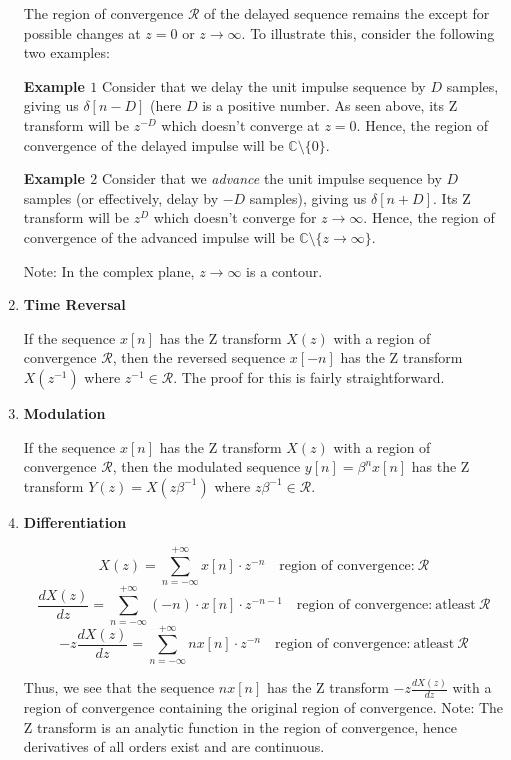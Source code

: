 \documentclass{article}
\theoremstyle{definition}
\begin{document}
\begin{enumerate}
The region of convergence $\mathcal{R}$ of the delayed sequence remains the except for possible changes at $z=0$ or $z \rightarrow \infty$. To illustrate this, consider the following two examples: \smallskip

\textbf{Example $1$} Consider that we delay the unit impulse sequence by $D$ samples, giving us $\delta[n-D]$ (here $D$ is a positive number. As seen above, its Z transform will be $z^{-D}$ which doesn't converge at $z=0$. Hence, the region of convergence of the delayed impulse will be $\mathbb{C} \setminus \{0\}$. \smallskip

\textbf{Example $2$} Consider that we \textit{advance} the unit impulse sequence by $D$ samples (or effectively, delay by $-D$ samples), giving us $\delta[n+D]$. Its Z transform will be $z^D$ which doesn't converge for $z \rightarrow \infty$. Hence, the region of convergence of the advanced impulse will be $\mathbb{C} \setminus \{ z \rightarrow \infty \}$. \smallskip

Note: In the complex plane, $z \rightarrow \infty$ is a contour. 
\item \textbf{Time Reversal}

If the sequence $x[n]$ has the Z transform $X(z)$ with a region of convergence $\mathcal{R}$, then the reversed sequence $x[-n]$ has the Z transform $X(z^{-1})$ where $z^{-1} \in \mathcal{R}$. The proof for this is fairly straightforward.

\item \textbf{Modulation}

If the sequence $x[n]$ has the Z transform $X(z)$ with a region of convergence $\mathcal{R}$, then the modulated sequence $y[n] = \beta^n x[n]$ has the Z transform $Y(z) = X(z \beta^{-1})$ where $z\beta^{-1} \in \mathcal{R}$.

\item \textbf{Differentiation}

\[
	X(z) = \sum_{n=-\infty}^{+\infty} x[n] \cdot z^{-n} \quad \text{region of convergence:} \: \mathcal{R}
\]
\[
	\frac{dX(z)}{dz} = \sum_{n=-\infty}^{+\infty} (-n) \cdot x[n] \cdot z^{-n-1} \quad \text{region of convergence:} \: \text{atleast} \: \mathcal{R}
\]
\[
	-z \frac{dX(z)}{dz} = \sum_{n=-\infty}^{+\infty} n x[n] \cdot z^{-n} \quad \text{region of convergence:} \: \text{atleast} \: \mathcal{R}
\]

Thus, we see that the sequence $n x[n]$ has the Z transform $-z \frac{dX(z)}{dz}$ with a region of convergence containing the original region of convergence. Note: The Z transform is an analytic function in the region of convergence, hence derivatives of all orders exist and are continuous.  \smallskip


\end{enumerate}
\end{document}

